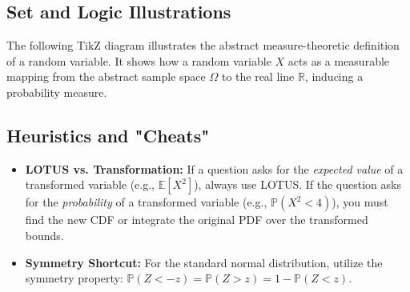 \documentclass[11pt, a4paper]{article}
\theoremstyle{definition}
\theoremstyle{remark}
\newcommand{\R}{\mathbb{R}}
\newcommand{\E}{\mathbb{E}}
\newcommand{\Prob}{\mathbb{P}}
\begin{document}
\subsection{Set and Logic Illustrations}
The following TikZ diagram illustrates the abstract measure-theoretic definition of a random variable. It shows how a random variable $X$ acts as a measurable mapping from the abstract sample space $\Omega$ to the real line $\R$, inducing a probability measure.

\begin{center}
\end{center}


\subsection{Heuristics and "Cheats"}
\begin{itemize}
    \item \textbf{LOTUS vs. Transformation:} If a question asks for the \textit{expected value} of a transformed variable (e.g., $\E[X^2]$), always use LOTUS. If the question asks for the \textit{probability} of a transformed variable (e.g., $\Prob(X^2 < 4)$), you must find the new CDF or integrate the original PDF over the transformed bounds.
    \item \textbf{Symmetry Shortcut:} For the standard normal distribution, utilize the symmetry property: $\Prob(Z < -z) = \Prob(Z > z) = 1 - \Prob(Z < z)$.
\end{itemize}
\end{document}
